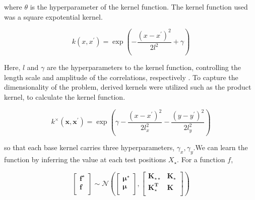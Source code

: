\documentclass[11pt, a4paper]{report}
\begin{document}
\vspace{0.5cm}

\noindent where \(\theta\) is the hyperparameter of the kernel function. The kernel function used was a square expotential kernel.

\vspace{0.5cm}

\begin{equation}
    k(x,x^{'})=\exp \left( -\frac{(x-x^{'})^2}{2l^2} + \gamma\right)
\end{equation}

\vspace{0.5cm}

Here, \(l\) and \(\gamma\) are the hyperparameters to the kernel function, controlling the
length scale and amplitude of the correlations, respectively \parencite{Molina2023}.
To capture the dimensionality of the problem, derived kernels were utilized such as
the product kernel, to calculate the kernel function. 

\vspace{0.5cm}

\begin{equation}
    k^{\times}(\boldsymbol{x},\boldsymbol{x^{'}})
        = \exp\left(\gamma - \frac{(x-x^{'})^2}{2l_x^2} - \frac{(y-y^{'})^2}{2l_y^2}\right)
\end{equation}

\vspace{0.5cm}

\noindent so that each base kernel carries three hyperparameters, \(\gamma _x, \gamma _y\).We can learn the function by inferring the value at each test positions \(X_{\star}\). For a function \(f\),

\vspace{0.5cm}

\begin{equation}
    \begin{bmatrix}
        \boldsymbol{f^{\star}} \\
        \boldsymbol{f} \\
    \end{bmatrix}
        \sim
    \mathcal{N}\left(
        \begin{bmatrix}
            \boldsymbol{\mu^{\star}} \\
            \boldsymbol{\mu} \\
        \end{bmatrix}
        ,
        \begin{bmatrix}
            \boldsymbol{K_{\star \star}} & \boldsymbol{K_{\star}}\\
            \boldsymbol{K^{T}_{\star}}  & \boldsymbol{K} \\
        \end{bmatrix}
    \right)
\end{equation}
\end{document}
